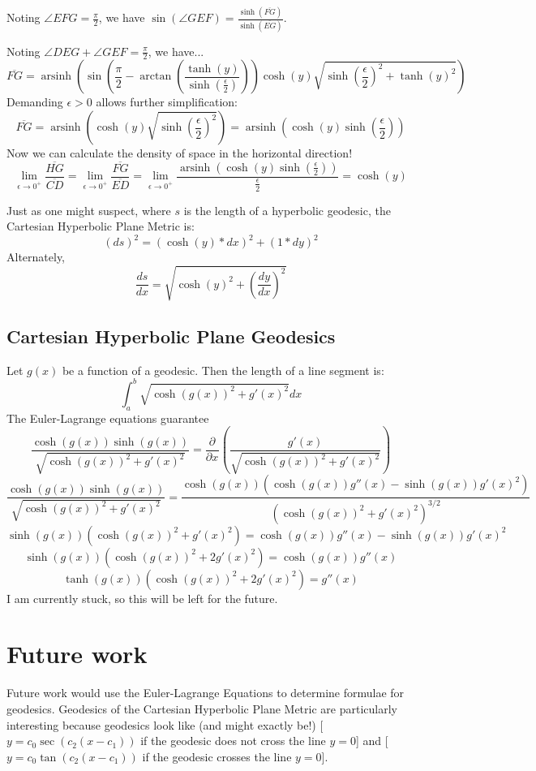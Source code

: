 \documentclass[]{article}
\DeclareMathOperator{\arsinh}{arsinh}
\newcommand{\pqty}[1]{{\left(#1\right)}}
\newcommand{\pdiff}[2]{\frac{\partial^{#2}}{\partial #1^{#2}}}
\numberwithin{equation}{section}
\begin{document}
	Noting $\angle{EFG}=\frac{\pi}{2}$, we have $\sin\pqty{\angle{GEF}}=\frac{\sinh\pqty{\overline{FG}}}{\sinh\pqty{\overline{EG}}}$.
	
	Noting $\angle{DEG}+\angle{GEF}=\frac{\pi}{2}$, we have...
	$$\overline{FG} = \arsinh\pqty{
		\sin\pqty{\frac{\pi}{2}-\arctan\pqty{\frac{\tanh\pqty{y}}{\sinh\pqty{\frac{\epsilon}{2}}}}}
		\cosh\pqty{y}
		\sqrt{\sinh\pqty{\frac{\epsilon}{2}}^2+\tanh\pqty{y}^2}
	}$$
	Demanding $\epsilon>0$ allows further simplification:
	$$\overline{FG} = \arsinh\pqty{
		\cosh\pqty{y}
		\sqrt{\sinh\pqty{\frac{\epsilon}{2}}^2}
	} = \arsinh\pqty{
		\cosh\pqty{y}
		\sinh\pqty{\frac{\epsilon}{2}}
	}$$
	Now we can calculate the density of space in the horizontal direction!
	$$
	\lim\limits_{\epsilon\to 0^+}\frac{\overline{HG}}{\overline{CD}}=
	\lim\limits_{\epsilon\to 0^+}\frac{\overline{FG}}{\overline{ED}}=
	\lim\limits_{\epsilon\to 0^+}\frac{\arsinh\pqty{
			\cosh\pqty{y}
			\sinh\pqty{\frac{\epsilon}{2}}
	}}{\frac{\epsilon}{2}}
	=\cosh\pqty{y}
	$$
	
	Just as one might suspect, where $s$ is the length of a hyperbolic geodesic, the Cartesian Hyperbolic Plane Metric is:
	$$\pqty{ds}^2=\pqty{\cosh\pqty{y}*dx}^2+\pqty{1*dy}^2$$
	Alternately,
	$$\frac{ds}{dx}=\sqrt{\cosh\pqty{y}^2+\pqty{\frac{dy}{dx}}^2}$$
	
	\subsection{Cartesian Hyperbolic Plane Geodesics}
	Let $g\pqty{x}$ be a function of a geodesic. Then the length of a line segment is:
	$$\int_{a}^{b}\sqrt{\cosh\pqty{g\pqty{x}}^2+g'\pqty{x}^2}dx$$
	The Euler-Lagrange equations guarantee
	$$\frac{\cosh\pqty{g\pqty{x}}\sinh\pqty{g\pqty{x}}}{\sqrt{\cosh\pqty{g\pqty{x}}^2+g'\pqty{x}^2}}
	=\pdiff{x}{}\pqty{\frac{g'\pqty{x}}{\sqrt{\cosh\pqty{g\pqty{x}}^2+g'\pqty{x}^2}}}
	$$
	$$\frac{\cosh\pqty{g\pqty{x}}\sinh\pqty{g\pqty{x}}}{\sqrt{\cosh\pqty{g\pqty{x}}^2+g'\pqty{x}^2}}
	=\frac{\cosh\pqty{g\pqty{x}}\pqty{\cosh\pqty{g\pqty{x}}g''\pqty{x}-\sinh\pqty{g\pqty{x}}g'\pqty{x}^2}}
	{\pqty{\cosh\pqty{g\pqty{x}}^2+g'\pqty{x}^2}^{3/2}}
	$$
	$$\sinh\pqty{g\pqty{x}}\pqty{\cosh\pqty{g\pqty{x}}^2+g'\pqty{x}^2}
	=\cosh\pqty{g\pqty{x}}g''\pqty{x}-\sinh\pqty{g\pqty{x}}g'\pqty{x}^2
	$$
	$$\sinh\pqty{g\pqty{x}}\pqty{\cosh\pqty{g\pqty{x}}^2+2g'\pqty{x}^2}
	=\cosh\pqty{g\pqty{x}}g''\pqty{x}
	$$
	$$\tanh\pqty{g\pqty{x}}\pqty{\cosh\pqty{g\pqty{x}}^2+2g'\pqty{x}^2}=g''\pqty{x}$$
	I am currently stuck, so this will be left for the future.
		
	\section{Future work}
	Future work would use the Euler-Lagrange Equations to determine formulae for geodesics. Geodesics of the Cartesian Hyperbolic Plane Metric are particularly interesting because geodesics look like (and might exactly be!) [$y=c_0\sec\pqty{c_2\pqty{x-c_1}}$ if the geodesic does not cross the line $y=0$] and [$y=c_0\tan\pqty{c_2\pqty{x-c_1}}$ if the geodesic crosses the line $y=0$].
\end{document}
